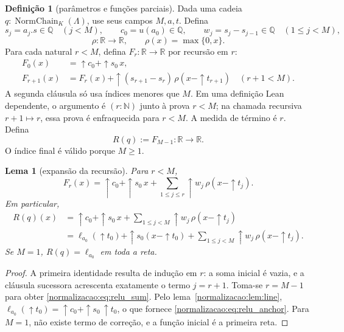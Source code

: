 \documentclass[12pt,a4paper]{article}
\theoremstyle{preciso}
\newtheorem{lema}[teorema]{Lema}
\theoremstyle{definition}
\newtheorem{definicao}[teorema]{Definição}
\newcommand{\N}{\mathbb N}
\newcommand{\Q}{\mathbb Q}
\newcommand{\R}{\mathbb R}
\theoremstyle{preciso}
\theoremstyle{preciso}
\theoremstyle{preciso}
\theoremstyle{preciso}
\theoremstyle{definition}
\theoremstyle{preciso}
\theoremstyle{definition}
\theoremstyle{preciso}
\theoremstyle{preciso}
\theoremstyle{definition}
\begin{document}
\begin{definicao}[parâmetros e funções parciais]\label{map:normalizacao:8.1}\label{normalizacao:def:relu}
Dada uma cadeia $q:\operatorname{NormChain}_K(\Lambda)$, use seus
campos $M,a,t$. Defina
\[
 s_j=a_j.s\in\Q\quad(j<M),\qquad
 c_0=u(a_0)\in\Q,\qquad
 w_j=s_j-s_{j-1}\in\Q\quad(1\le j<M),
\]
\[
 \rho:\R\to\R,\qquad\rho(x)=\max\{0,x\}.
\]
Para cada natural $r<M$, defina $F_r:\R\to\R$ por recursão em $r$:
\begin{align*}
 F_0(x)&=\uparrow c_0+\uparrow s_0\,x,\\
 F_{r+1}(x)&=F_r(x)+\uparrow(s_{r+1}-s_r)\,
                       \rho(x-\uparrow t_{r+1})
                    \quad(r+1<M).
\end{align*}
A segunda cláusula só usa índices menores que $M$. Em uma definição
Lean dependente, o argumento é $(r:\N)$ junto à prova $r<M$;
na chamada recursiva $r+1\mapsto r$, essa prova é enfraquecida
para $r<M$. A medida de término é $r$.
Defina
\[
 R(q):=F_{M-1}:\R\to\R.
\]
O índice final é válido porque $M\ge1$.
\end{definicao}

\begin{lema}[expansão da recursão]\label{map:normalizacao:8.2}\label{normalizacao:lem:sum}
Para $r<M$,
\[
 F_r(x)=\uparrow c_0+\uparrow s_0\,x+
        \sum_{1\le j\le r}\uparrow w_j\,\rho(x-\uparrow t_j).
\]
Em particular,
\begin{align}
 R(q)(x)&=\uparrow c_0+\uparrow s_0\,x+
        \sum_{1\le j<M}\uparrow w_j\,\rho(x-\uparrow t_j)
                                                       \label{normalizacao:eq:relu_sum}\\
 &=\ell_{a_0}(\uparrow t_0)+\uparrow s_0(x-\uparrow t_0)+
        \sum_{1\le j<M}\uparrow w_j\,\rho(x-\uparrow t_j).
                                                       \label{normalizacao:eq:relu_anchor}
\end{align}
Se $M=1$, $R(q)=\ell_{a_0}$ em toda a reta.
\end{lema}
\begin{proof}
A primeira identidade resulta de indução em $r$: a soma inicial é vazia,
e a cláusula sucessora acrescenta exatamente o termo $j=r+1$.
Toma-se $r=M-1$ para obter \eqref{normalizacao:eq:relu_sum}. Pelo
lema~\ref{normalizacao:lem:line},
$\ell_{a_0}(\uparrow t_0)=\uparrow c_0+\uparrow s_0\,\uparrow t_0$,
o que fornece \eqref{normalizacao:eq:relu_anchor}. Para $M=1$, não existe termo de
correção, e a função inicial é a primeira reta.
\end{proof}
\end{document}
